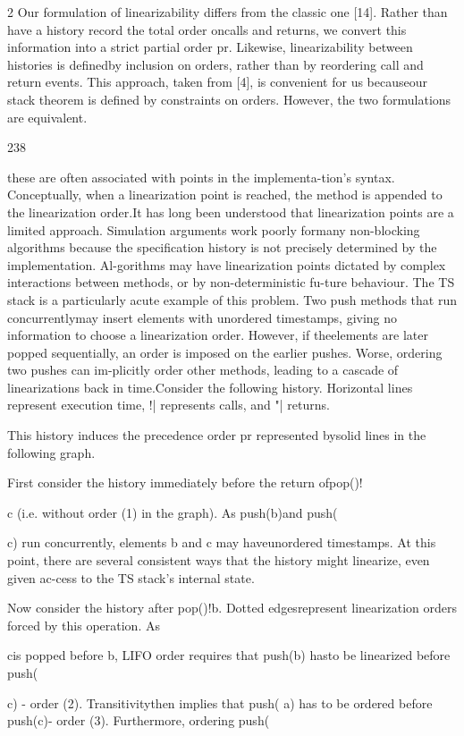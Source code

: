 2 Our formulation of linearizability differs from the classic
one [14]. Rather than have a history record the total order oncalls and returns, we convert this information into a strict partial order pr. Likewise, linearizability between histories is definedby inclusion on orders, rather than by reordering call and return
events. This approach, taken from [4], is convenient for us becauseour stack theorem is defined by constraints on orders. However,
the two formulations are equivalent.

238

these are often associated with points in the implementa-tion's syntax. Conceptually, when a linearization point is
reached, the method is appended to the linearization order.It has long been understood that linearization points are
a limited approach. Simulation arguments work poorly formany non-blocking algorithms because the specification history is not precisely determined by the implementation. Al-gorithms may have linearization points dictated by complex
interactions between methods, or by non-deterministic fu-ture behaviour. The TS stack is a particularly acute example
of this problem. Two push methods that run concurrentlymay insert elements with unordered timestamps, giving no
information to choose a linearization order. However, if theelements are later popped sequentially, an order is imposed
on the earlier pushes. Worse, ordering two pushes can im-plicitly order other methods, leading to a cascade of linearizations back in time.Consider the following history. Horizontal lines represent
execution time, !| represents calls, and "| returns.

This history induces the precedence order pr represented bysolid lines in the following graph.

First consider the history immediately before the return ofpop()!

c (i.e. without order (1) in the graph). As push(b)and push(

c) run concurrently, elements b and c may haveunordered timestamps. At this point, there are several consistent ways that the history might linearize, even given ac-cess to the TS stack's internal state.

Now consider the history after pop()!b. Dotted edgesrepresent linearization orders forced by this operation. As

cis popped before
b, LIFO order requires that push(b) hasto be linearized before push(

c) - order (2). Transitivitythen implies that push(
a) has to be ordered before push(c)- order (3). Furthermore, ordering push(

